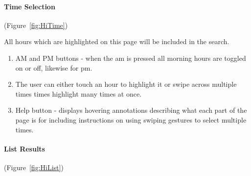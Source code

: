 \paragraph{Time Selection}

(Figure~\ref{fig:HiTime})


All hours which are highlighted on this page will be included in the
search.
\begin{enumerate}
	\item AM and PM buttons - when the am is pressed all morning hours are toggled
	      on or off, likewise for pm.
	\item The user can either touch an hour to highlight it or swipe across
	      multiple times times highlight many times at once.
	\item Help button - displays hovering annotations describing what each part
	      of the page is for including instructions on using swiping gestures
	      to select multiple times.
\end{enumerate}

\paragraph{List Results}

(Figure~\ref{fig:HiList})


